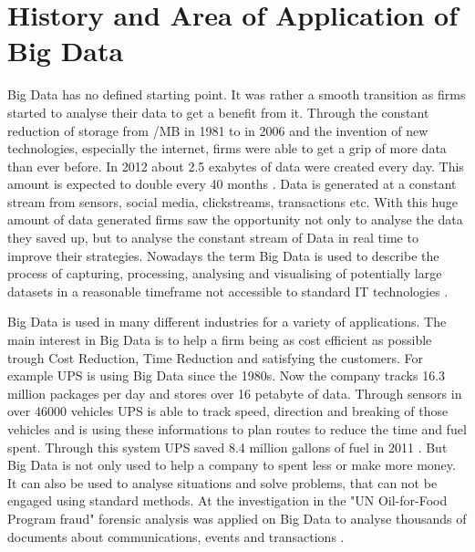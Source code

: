 \documentclass[runningheads]{llncs}
\begin{document}
\section{History and Area of Application of Big Data}
Big Data has no defined starting point. It was rather a smooth transition as firms started to analyse their data to get a benefit from it. Through the constant reduction of storage from /MB in 1981 to  in 2006 \cite{PCMAGAZINE} and the invention of new technologies, especially the internet, firms were able to get a grip of more data than ever before. 
In 2012 about 2.5 exabytes of data were created every day. This amount is expected to double every 40 months \cite{MCAFEE}. Data is generated at a constant stream from sensors, social media, clickstreams, transactions etc. With this huge amount of data generated firms saw the opportunity not only to analyse the data they saved up, but to analyse the constant stream of Data in real time to improve their strategies. Nowadays the term Big Data is used to describe the process of capturing, processing, analysing and visualising of potentially large datasets in a reasonable timeframe not accessible to standard IT technologies \cite{NESSI}. 

Big Data is used in many different industries for a variety of applications. The main interest in Big Data is to help a firm being as cost efficient as possible trough Cost Reduction, Time Reduction and satisfying the customers. For example UPS is using Big Data since the 1980s. Now the company tracks 16.3 million packages per day and stores over 16 petabyte of data. Through sensors in over 46000 vehicles UPS is able to track speed, direction and breaking of those vehicles and is using these informations to plan routes to reduce the time and fuel spent. Through this system UPS saved 8.4 million gallons of fuel in 2011 \cite{DAVENPORT}. But Big Data is not only used to help a company to spent less or make more money. It can also be used to analyse situations and solve problems, that can not be engaged using standard methods. At the investigation in the "UN Oil-for-Food Program fraud" forensic analysis was applied on Big Data to analyse thousands of documents about communications, events and transactions \cite{Hans}.
\end{document}
